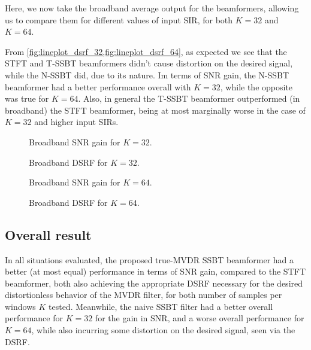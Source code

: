 Here, we now take the broadband average output for the beamformers, allowing us to compare them for different values of input SIR, for both $K = 32$ and $K = 64$.

From \cref{fig:lineplot_dsrf_32,fig:lineplot_dsrf_64}, as expected we see that the STFT and T-SSBT beamformers didn't cause distortion on the desired signal, while the N-SSBT did, due to its nature. Im terms of SNR gain, the N-SSBT beamformer had a better performance overall with $K = 32$, while the opposite was true for $K = 64$. Also, in general the T-SSBT beamformer outperformed (in broadband) the STFT beamformer, being at most marginally worse in the case of $K = 32$ and higher input SIRs.
\begin{figure}[H]
	\centering
	
	\caption{Broadband SNR gain for $K = 32$.}
	\label{fig:lineplot_gain_32}
\end{figure}
\begin{figure}[H]
	\centering
	
	\caption{Broadband DSRF for $K = 32$.}
	\label{fig:lineplot_dsrf_32}
\end{figure}

\begin{figure}[H]
	\centering
	
	\caption{Broadband SNR gain for $K = 64$.}
	\label{fig:lineplot_gain_64}
\end{figure}
\begin{figure}[H]
	\centering
	
	\caption{Broadband DSRF for $K = 64$.}
	\label{fig:lineplot_dsrf_64}
\end{figure}

\subsection{Overall result}

In all situations evaluated, the proposed true-MVDR SSBT beamformer had a better (at most equal) performance in terms of SNR gain, compared to the STFT beamformer, both also achieving the appropriate DSRF necessary for the desired distortionless behavior of the MVDR filter, for both number of samples per windows $K$ tested. Meanwhile, the naive SSBT filter had a better overall performance for $K = 32$ for the gain in SNR, and a worse overall performance for $K = 64$, while also incurring some distortion on the desired signal, seen via the DSRF.